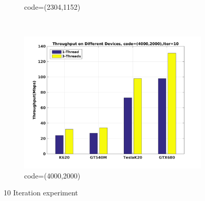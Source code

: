 \documentclass[10pt,a4paper]{article}
\begin{document}
\begin{figure}[H]
\begin{subfigure}[b]{0.6\textwidth}
    \caption{code=(2304,1152)}
    \label{fig:throu_10_b}
  \end{subfigure}
  \\
    \begin{subfigure}[b]{0.7\textwidth}
    \includegraphics[width=\textwidth]{c_4k_10.jpg}
    \caption{code=(4000,2000)}
    \label{fig:throu_10_c}
  \end{subfigure}
  \caption{10 Iteration experiment}\label{fig:10iter}
\end{figure}
\end{document}
